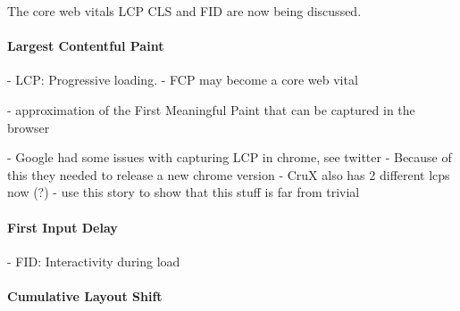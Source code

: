  
The core web vitals LCP CLS and FID are now being discussed. 







\paragraph{Largest Contentful Paint}





- LCP: Progressive loading.
- FCP may become a core web vital






- approximation of the First Meaningful Paint that can be captured in the browser








 
- Google had some issues with capturing LCP in chrome, see twitter
- Because of this they needed to release a new chrome version
- CruX also has 2 different lcps now (?)
- use this story to show that this stuff is far from trivial





\paragraph{First Input Delay}



- FID: Interactivity during load







\paragraph{Cumulative Layout Shift}

